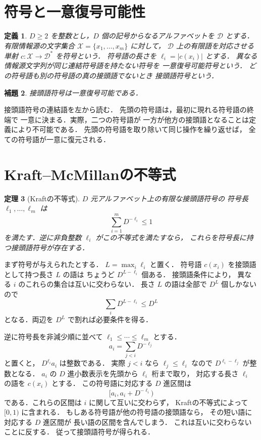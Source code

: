 \documentclass[a5paper,10pt,onecolumn]{jsarticle}
\makeatletter
\theoremstyle{mathnotetheorem}
\newtheorem{theorem}{定理}[section]
\newtheorem{definition}[theorem]{定義}
\newtheorem{lemma}[theorem]{補題}
\renewcommand{\proofname}{証明}
\renewenvironment{proof}[1][\proofname]{%
  \par\pushQED{\qed}\normalfont\topsep4\p@\@plus2\p@\relax
  \trivlist\item[\hskip\labelsep\bfseries #1]\ignorespaces
}{\popQED\endtrivlist\@endpefalse}
\makeatother
\begin{document}
\section{符号と一意復号可能性}

\begin{definition}
$D\ge2$ を整数とし，$D$ 個の記号からなるアルファベットを
$\mathcal D$ とする．
有限情報源の文字集合 $\mathcal X=\{x_1,\dots,x_m\}$ に対して，
$\mathcal D$ 上の有限語を対応させる単射
$c:\mathcal X\to\mathcal D^*$ を\emph{符号}という．
符号語の長さを $\ell_i=|c(x_i)|$ とする．
異なる情報源文字列が同じ連結符号語を持たない符号を
\emph{一意復号可能符号}という．
どの符号語も別の符号語の真の接頭語でないとき
\emph{接頭語符号}という．
\end{definition}

\begin{lemma}\label{lem:prefix-unique}
接頭語符号は一意復号可能である．
\end{lemma}
\begin{proof}
接頭語符号の連結語を左から読む．
先頭の符号語は，最初に現れる符号語の終端で
一意に決まる．実際，二つの符号語が
一方が他方の接頭語となることは定義により不可能である．
先頭の符号語を取り除いて同じ操作を繰り返せば，
全ての符号語が一意に復元される．
\end{proof}

\section{Kraft--McMillanの不等式}

\begin{theorem}[Kraftの不等式]\label{thm:kraft}
$D$ 元アルファベット上の有限な接頭語符号の
符号長 $\ell_1,\dots,\ell_m$ は
\[
 \sum_{i=1}^mD^{-\ell_i}\le1
\]
を満たす．逆に非負整数 $\ell_i$ がこの不等式を満たすなら，
これらを符号長に持つ接頭語符号が存在する．
\end{theorem}
\begin{proof}
まず符号が与えられたとする．
$L=\max_i\ell_i$ と置く．
符号語 $c(x_i)$ を接頭語として持つ長さ $L$ の語は
ちょうど $D^{L-\ell_i}$ 個ある．
接頭語条件により，
異なる $i$ のこれらの集合は互いに交わらない．
長さ $L$ の語は全部で $D^L$ 個しかないので
\[
 \sum_iD^{L-\ell_i}\le D^L
\]
となる．両辺を $D^L$ で割れば必要条件を得る．

逆に符号長を非減少順に並べて
$\ell_1\le\cdots\le\ell_m$ とする．
\[
 a_i=\sum_{j<i}D^{-\ell_j}
\]
と置くと，
$D^{\ell_i}a_i$ は整数である．
実際 $j<i$ なら $\ell_j\le\ell_i$ なので
$D^{\ell_i-\ell_j}$ が整数となる．
$a_i$ の $D$ 進小数表示を先頭から $\ell_i$ 桁まで取り，
対応する長さ $\ell_i$ の語を $c(x_i)$ とする．
この符号語に対応する $D$ 進区間は
\[
 [a_i,a_i+D^{-\ell_i})
\]
である．これらの区間は $i$ に関して互いに交わらず，
Kraftの不等式によって $[0,1)$ に含まれる．
もしある符号語が他の符号語の接頭語なら，
その短い語に対応する $D$ 進区間が
長い語の区間を含んでしまう．
これは互いに交わらないことに反する．
従って接頭語符号が得られる．
\end{proof}
\end{document}
